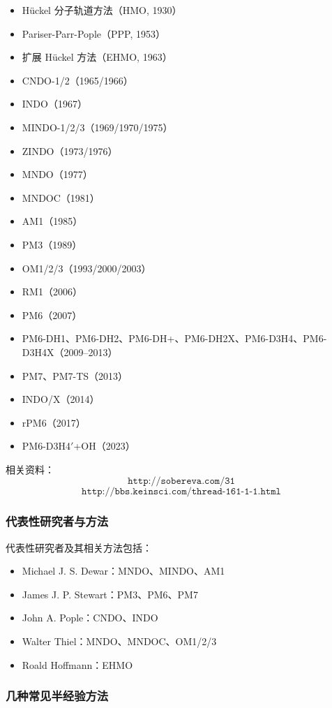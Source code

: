 \begin{itemize}
  \item H\"uckel 分子轨道方法（HMO, 1930）
  \item Pariser-Parr-Pople（PPP, 1953）
  \item 扩展 H\"uckel 方法（EHMO, 1963）
  \item CNDO-1/2（1965/1966）
  \item INDO（1967）
  \item MINDO-1/2/3（1969/1970/1975）
  \item ZINDO（1973/1976）
  \item MNDO（1977）
  \item MNDOC（1981）
  \item AM1（1985）
  \item PM3（1989）
  \item OM1/2/3（1993/2000/2003）
  \item RM1（2006）
  \item PM6（2007）
  \item PM6-DH1、PM6-DH2、PM6-DH+、PM6-DH2X、PM6-D3H4、PM6-D3H4X（2009--2013）
  \item PM7、PM7-TS（2013）
  \item INDO/X（2014）
  \item rPM6（2017）
  \item PM6-D3H4$'$+OH（2023）
\end{itemize}

相关资料：
\[
\texttt{http://sobereva.com/31}
\]
\[
\texttt{http://bbs.keinsci.com/thread-161-1-1.html}
\]

\subsubsection*{代表性研究者与方法}

代表性研究者及其相关方法包括：
\begin{itemize}
  \item Michael J. S. Dewar：MNDO、MINDO、AM1
  \item James J. P. Stewart：PM3、PM6、PM7
  \item John A. Pople：CNDO、INDO
  \item Walter Thiel：MNDO、MNDOC、OM1/2/3
  \item Roald Hoffmann：EHMO
\end{itemize}

\subsubsection*{几种常见半经验方法}


